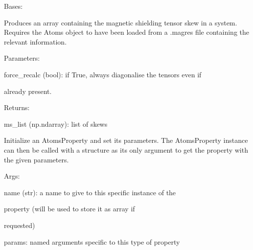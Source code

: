 \documentclass[letterpaper,10pt,english]{sphinxmanual}
\begin{document}
\begin{fulllineitems}
\label{doctree/soprano.properties.nmr.ms:soprano.properties.nmr.ms.MSSkew}
Bases: {\hyperref[doctree/soprano.properties.atomsproperty:soprano.properties.atomsproperty.AtomsProperty]{\emph{}}}

Produces an array containing the magnetic shielding tensor skew
in a system.
Requires the Atoms object to have been loaded from a .magres file
containing the relevant information.

\begin{DUlineblock}{0em}
\item[] Parameters:
\item[]
\begin{DUlineblock}{\DUlineblockindent}
\item[] force\_recalc (bool): if True, always diagonalise the tensors even if
\item[]
\begin{DUlineblock}{\DUlineblockindent}
\item[] already present.
\end{DUlineblock}
\end{DUlineblock}
\end{DUlineblock}

\begin{DUlineblock}{0em}
\item[] Returns:
\item[]
\begin{DUlineblock}{\DUlineblockindent}
\item[] ms\_list (np.ndarray): list of skews
\end{DUlineblock}
\end{DUlineblock}

Initialize an AtomsProperty and set its parameters.
The AtomsProperty instance can then be called with a structure as its
only argument to get the property with the given parameters.

\begin{DUlineblock}{0em}
\item[] Args:
\item[]
\begin{DUlineblock}{\DUlineblockindent}
\item[] name (str): a name to give to this specific instance of the
\item[]
\begin{DUlineblock}{\DUlineblockindent}
\item[] property (will be used to store it as array if
\item[] requested)
\end{DUlineblock}
\item[] params: named arguments specific to this type of property
\end{DUlineblock}
\end{DUlineblock}


\end{fulllineitems}
\end{document}
